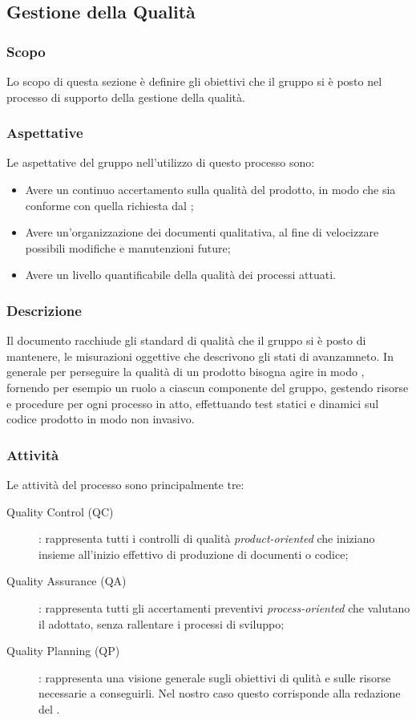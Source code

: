 \subsection{Gestione della Qualità}
\subsubsection{Scopo}
Lo scopo di questa sezione è definire gli obiettivi che il gruppo si è posto nel processo di supporto della gestione della qualità. 

\subsubsection{Aspettative}
Le aspettative del gruppo \Gruppo{} nell'utilizzo di questo processo sono:
\begin{itemize}
	\item Avere un continuo accertamento sulla qualità del prodotto, in modo che sia conforme con quella richiesta dal ;
	\item Avere un'organizzazione dei documenti qualitativa, al fine di velocizzare possibili modifiche e manutenzioni future;
	\item Avere un livello quantificabile della qualità dei processi attuati.
\end{itemize}

\subsubsection{Descrizione}
Il documento \PdQv racchiude gli standard di qualità che il gruppo si è posto di mantenere, le misurazioni oggettive che descrivono gli stati di avanzamneto.
In generale per perseguire la qualità di un prodotto bisogna agire in modo , fornendo per esempio un ruolo a ciascun componente del gruppo, gestendo risorse e procedure per ogni processo in atto, effettuando test statici e dinamici sul codice prodotto in modo non invasivo.

\subsubsection{Attività}
Le attività del processo sono principalmente tre:
\begin{description}
	\item[Quality Control (QC)] : rappresenta tutti i controlli di qualità \textit{product-oriented} che iniziano insieme all'inizio effettivo di produzione di documenti o codice;
	\item[Quality Assurance (QA)] : rappresenta tutti gli accertamenti preventivi \textit{process-oriented} che valutano il  adottato, senza rallentare i processi di sviluppo;
	\item[Quality Planning (QP)] : rappresenta una visione generale sugli obiettivi di qulità e sulle risorse necessarie a conseguirli. Nel nostro caso questo corrisponde alla redazione del \PdQv.
\end{description}


